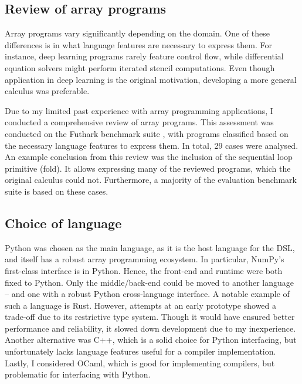 \subsection{Review of array programs}
\label{suite-review}

Array programs vary significantly depending on the domain. One of these differences is in what language features are necessary to express them. For instance, deep learning programs rarely feature control flow, while differential equation solvers might perform iterated stencil computations. Even though application in deep learning is the original motivation, developing a more general calculus was preferable.

Due to my limited past experience with array programming applications, I conducted a comprehensive review of array programs. This assessment was conducted on the Futhark benchmark suite \cite{The_Futhark_Hackers_futhark-benchmarks}, with programs classified based on the necessary language features to express them. In total, 29 cases were analysed.
An example conclusion from this review was the inclusion of the sequential loop primitive (fold). It allows expressing many of the reviewed programs, which the original calculus could not. 
Furthermore, a majority of the evaluation benchmark suite is based on these cases. 

\subsection{Choice of language}

Python was chosen as the main language, as it is the host language for the DSL, and itself has a robust array programming ecosystem. 
In particular, NumPy's first-class interface is in Python. 
Hence, the front-end and runtime were both fixed to Python. 
Only the middle/back-end could be moved to another language -- and one with a robust Python cross-language interface. A notable example of such a language is Rust. However, attempts at an early prototype showed a trade-off due to its restrictive type system. Though it would have ensured better performance and reliability, it slowed down development due to my inexperience. Another alternative was C++, which is a solid choice for Python interfacing, but unfortunately lacks language features useful for a compiler implementation. Lastly, I considered OCaml, which is good for implementing compilers, but problematic for interfacing with Python. 

